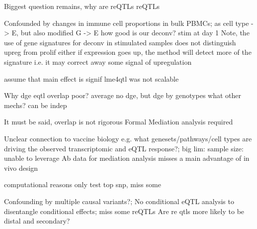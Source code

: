 


Biggest question remains, why are reQTLs reQTLs

Confounded by changes in immune cell proportions in bulk PBMCs;
as cell type -> E, but also modified G -> E
how good is our deconv? stim at day 1
Note, the use of gene signatures for deconv
    in stimulated samples
    does not distinguish upreg from prolif either
    if expression goes up, the method will detect more of the signature
    i.e. it may correct away some signal of upregulation

assume that main effect is signif 
lme4qtl was not scalable


Why dge eqtl overlap poor?
average no dge, but dge by genotypes
what other mechs?
can be indep

It must be said, overlap is not rigorous
Formal Mediation analysis required

Unclear connection to vaccine biology e.g. what genesets/pathways/cell types are driving the observed transcriptomic and eQTL response?;
big lim: sample size: unable to leverage Ab data for mediation analysis
misses a main advantage of in vivo design

computational reasons
only test top snp, miss some 

Confounding by multiple causal variants?;
No conditional eQTL analysis to disentangle conditional effects;
miss some reQTLs
Are re qtls more likely to be distal and secondary?


